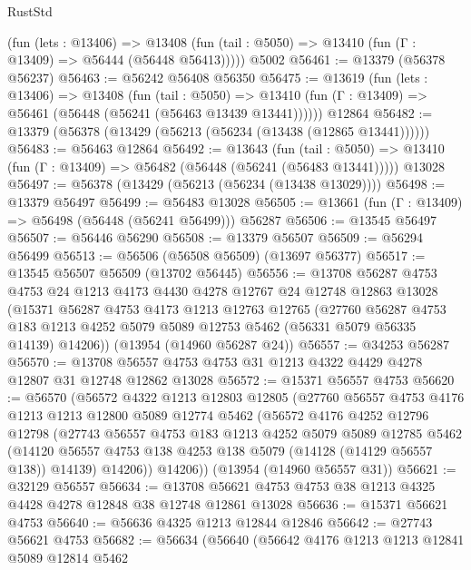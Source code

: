 \begin{lexlean}{RustStd}
\begin{coremodule}
      (fun (lets : @13406) =>
      @13408 (fun (tail : @5050) => @13410 (fun (Γ : @13409) => @56444 (@56448 @56413)))))
    @5002
@56461 := @13379 (@56378 @56237)
@56463 := @56242 @56408 @56350
@56475 := @13619
    (fun (lets : @13406) =>
    @13408
      (fun (tail : @5050) =>
      @13410 (fun (Γ : @13409) => @56461 (@56448 (@56241 (@56463 @13439 @13441))))))
    @12864
@56482 := @13379 (@56378 (@13429 (@56213 (@56234 (@13438 (@12865 @13441))))))
@56483 := @56463 @12864
@56492 := @13643
    (fun (tail : @5050) => @13410 (fun (Γ : @13409) => @56482 (@56448 (@56241 (@56483 @13441)))))
    @13028
@56497 := @56378 (@13429 (@56213 (@56234 (@13438 @13029))))
@56498 := @13379 @56497
@56499 := @56483 @13028
@56505 := @13661 (fun (Γ : @13409) => @56498 (@56448 (@56241 @56499))) @56287
@56506 := @13545 @56497
@56507 := @56446 @56290
@56508 := @13379 @56507
@56509 := @56294 @56499
@56513 := @56506 (@56508 @56509) (@13697 @56377)
@56517 := @13545 @56507 @56509 (@13702 @56445)
@56556 := @13708
    @56287
    @4753
    @4753
    @24
    @1213
    @4173
    @4430
    @4278
    @12767
    @24
    @12748
    @12863
    @13028
    (@15371
      @56287
      @4753
      @4173
      @1213
      @12763
      @12765
      (@27760
        @56287
        @4753
        @183
        @1213
        @4252
        @5079
        @5089
        @12753
        @5462
        (@56331 @5079 @56335 @14139)
        @14206))
    (@13954 (@14960 @56287 @24))
@56557 := @34253 @56287
@56570 := @13708 @56557 @4753 @4753 @31 @1213 @4322 @4429 @4278 @12807 @31 @12748 @12862 @13028
@56572 := @15371 @56557 @4753
@56620 := @56570
    (@56572
      @4322
      @1213
      @12803
      @12805
      (@27760
        @56557
        @4753
        @4176
        @1213
        @1213
        @12800
        @5089
        @12774
        @5462
        (@56572
          @4176
          @4252
          @12796
          @12798
          (@27743
            @56557
            @4753
            @183
            @1213
            @4252
            @5079
            @5089
            @12785
            @5462
            (@14120 @56557 @4753 @138 @4253 @138 @5079 (@14128 (@14129 @56557 @138)) @14139)
            @14206))
        @14206))
    (@13954 (@14960 @56557 @31))
@56621 := @32129 @56557
@56634 := @13708 @56621 @4753 @4753 @38 @1213 @4325 @4428 @4278 @12848 @38 @12748 @12861 @13028
@56636 := @15371 @56621 @4753
@56640 := @56636 @4325 @1213 @12844 @12846
@56642 := @27743 @56621 @4753
@56682 := @56634
    (@56640
      (@56642
        @4176
        @1213
        @1213
        @12841
        @5089
        @12814
        @5462

\end{coremodule}
\end{lexlean}
